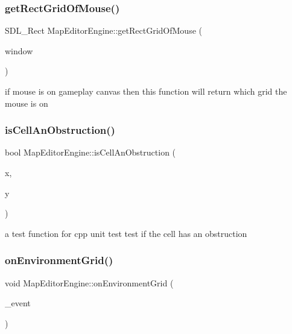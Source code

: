 \subsubsection{\texorpdfstring{get\+Rect\+Grid\+Of\+Mouse()}{getRectGridOfMouse()}}
{\footnotesize\ttfamily S\+D\+L\+\_\+\+Rect Map\+Editor\+Engine\+::get\+Rect\+Grid\+Of\+Mouse (\begin{DoxyParamCaption}\item[{\hyperlink{class_level_window}{Level\+Window} $\ast$}]{window }\end{DoxyParamCaption})}

if mouse is on gameplay canvas then this function will return which grid the mouse is on \hypertarget{class_map_editor_engine_aa8f2eec7f99782943317f61e0ff98123}{}\label{class_map_editor_engine_aa8f2eec7f99782943317f61e0ff98123} 
\subsubsection{\texorpdfstring{is\+Cell\+An\+Obstruction()}{isCellAnObstruction()}}
{\footnotesize\ttfamily bool Map\+Editor\+Engine\+::is\+Cell\+An\+Obstruction (\begin{DoxyParamCaption}\item[{int}]{x,  }\item[{int}]{y }\end{DoxyParamCaption})}

a test function for cpp unit test test if the cell has an obstruction \hypertarget{class_map_editor_engine_af7f6e1fec6f7598ace52902f996980bd}{}\label{class_map_editor_engine_af7f6e1fec6f7598ace52902f996980bd} 
\subsubsection{\texorpdfstring{on\+Environment\+Grid()}{onEnvironmentGrid()}}
{\footnotesize\ttfamily void Map\+Editor\+Engine\+::on\+Environment\+Grid (\begin{DoxyParamCaption}\item[{S\+D\+L\+\_\+\+Event $\ast$}]{\+\_\+event }\end{DoxyParamCaption})}

